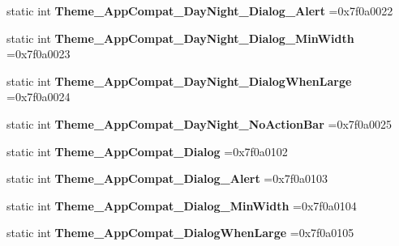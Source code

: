 \begin{DoxyCompactItemize}
static int {\bfseries Theme\+\_\+\+App\+Compat\+\_\+\+Day\+Night\+\_\+\+Dialog\+\_\+\+Alert} =0x7f0a0022
\item 
\mbox{\label{classandroid_1_1support_1_1v7_1_1mediarouter_1_1R_1_1style_aafa3df36cc20552682d4ca375c9996fc}} 
static int {\bfseries Theme\+\_\+\+App\+Compat\+\_\+\+Day\+Night\+\_\+\+Dialog\+\_\+\+Min\+Width} =0x7f0a0023
\item 
\mbox{\label{classandroid_1_1support_1_1v7_1_1mediarouter_1_1R_1_1style_af6663de50745782bd284f24f14611a21}} 
static int {\bfseries Theme\+\_\+\+App\+Compat\+\_\+\+Day\+Night\+\_\+\+Dialog\+When\+Large} =0x7f0a0024
\item 
\mbox{\label{classandroid_1_1support_1_1v7_1_1mediarouter_1_1R_1_1style_a1fc48e4090370d5ca5782f4f13028ee3}} 
static int {\bfseries Theme\+\_\+\+App\+Compat\+\_\+\+Day\+Night\+\_\+\+No\+Action\+Bar} =0x7f0a0025
\item 
\mbox{\label{classandroid_1_1support_1_1v7_1_1mediarouter_1_1R_1_1style_a04d7358ba6f9bc3ea1b8abd5f812013c}} 
static int {\bfseries Theme\+\_\+\+App\+Compat\+\_\+\+Dialog} =0x7f0a0102
\item 
\mbox{\label{classandroid_1_1support_1_1v7_1_1mediarouter_1_1R_1_1style_ae162ab9083aeb5fd0102193c8809d770}} 
static int {\bfseries Theme\+\_\+\+App\+Compat\+\_\+\+Dialog\+\_\+\+Alert} =0x7f0a0103
\item 
\mbox{\label{classandroid_1_1support_1_1v7_1_1mediarouter_1_1R_1_1style_a014db64eb031c665ef5b1c509bd8e4c4}} 
static int {\bfseries Theme\+\_\+\+App\+Compat\+\_\+\+Dialog\+\_\+\+Min\+Width} =0x7f0a0104
\item 
\mbox{\label{classandroid_1_1support_1_1v7_1_1mediarouter_1_1R_1_1style_a15812f46e00d0e7d3e439c509c1108e3}} 
static int {\bfseries Theme\+\_\+\+App\+Compat\+\_\+\+Dialog\+When\+Large} =0x7f0a0105
\item 

\end{DoxyCompactItemize}
